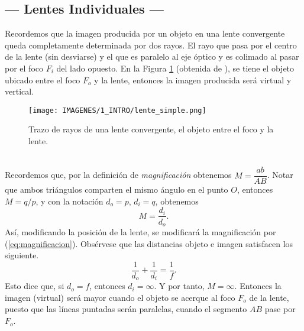 \documentclass[10pt,a4paper]{article}
\begin{document}
\subsection{--- Lentes Individuales ---} %
\label{sub:lentes_individuales}
Recordemos que la imagen producida por un objeto en una lente convergente queda completamente determinada por dos rayos.
El rayo que pasa por el centro de la lente (sin desviarse) y el que es paralelo al eje óptico y es colimado al pasar por el foco \(F_i\) del lado opuesto.
En la Figura \ref{fig:lente} (obtenida de ), se tiene el objeto ubicado entre el foco \(F_o\) y la lente, entonces la imagen producida será virtual y vertical.
\begin{figure}[ht]
	\centering
	\texttt{[image: IMAGENES/1\_INTRO/lente\_simple.png]}
	\caption{Trazo de rayos de una lente convergente, el objeto entre el foco y la lente.}
	\label{fig:lente}
\end{figure}\\
Recordemos que, por la definición de \textit{magnificación} obtenemos \(M = \dfrac{ab}{AB}\).
Notar que ambos triángulos comparten el mismo ángulo en el punto \(O\), entonces \(M=q/p\), y con la notación \(d_o=p\), \(d_i=q\), obtenemos
\begin{equation}
	M = \dfrac{d_i}{d_o}.
	\label{eq:magnificacion}
\end{equation}
Así, modificando la posición de la lente, se modificará la magnificación por (\ref{eq:magnificacion}).
Obsérvese que las distancias objeto e imagen satisfacen los siguiente.
\begin{equation}
	\dfrac{1}{d_o} + \dfrac{1}{d_i} = \dfrac{1}{f}.
	\label{eq:ley_lentes}
\end{equation}
Esto dice que, si \(d_o=f\), entonces \(d_i= \infty\). Y por tanto, \(M= \infty\).
Entonces la imagen (virtual) será mayor cuando el objeto se acerque al foco \(F_o\) de la lente, puesto que las líneas puntadas serán paralelas, cuando el segmento \(AB\) pase por \(F_o\).
\end{document}

